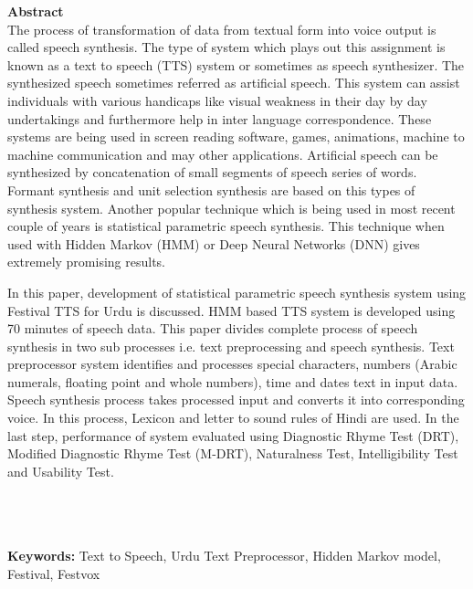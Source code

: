 
{\LARGE\textbf {Abstract}} \\ %
The process of transformation of data from textual form into voice output is called speech synthesis. The type of system which plays out this assignment is known as a text to speech (TTS) system or sometimes as speech synthesizer. The synthesized speech sometimes referred as artificial speech. This system can assist individuals with various handicaps like visual weakness in their day by day undertakings and furthermore help in inter language correspondence. These systems are being used in screen reading software, games, animations, machine to machine communication and may other applications. Artificial speech can be synthesized by concatenation of small segments of speech series of words. Formant synthesis and unit selection synthesis are based on this types of synthesis system. Another popular technique which is being used in most recent couple of years is statistical parametric speech synthesis. This technique when used with Hidden Markov (HMM) or Deep Neural Networks (DNN) gives extremely promising results.

In this paper, development of statistical parametric speech synthesis system using Festival TTS for Urdu is discussed. HMM based TTS system is developed using 70 minutes of speech data. This paper divides complete process of speech synthesis in two sub processes i.e. text preprocessing and speech synthesis. Text preprocessor system identifies and processes special characters, numbers (Arabic numerals, floating point and whole numbers), time and dates text in input data. Speech synthesis process takes processed input and converts it into corresponding voice. In this process, Lexicon and letter to sound rules of Hindi are used. In the last step, performance of system evaluated using Diagnostic Rhyme Test (DRT), Modified Diagnostic Rhyme Test (M-DRT), Naturalness Test, Intelligibility Test and Usability Test.


\\ \\ \\
\textbf{Keywords:}
Text to Speech, Urdu Text Preprocessor, Hidden Markov model, Festival, Festvox

